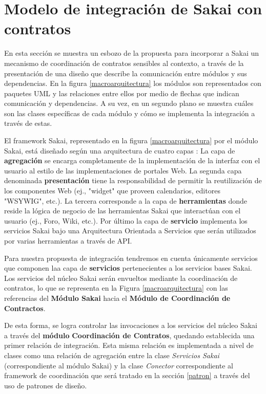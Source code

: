 \section {Modelo de integración de Sakai con contratos} \label{sec:integracion} \label{macro} 

En esta sección se muestra un esbozo de la propuesta para incorporar a Sakai un mecanismo de coordinación de contratos sensibles al contexto, a través de la presentación de una diseño que describe la comunicación entre módulos \cite{arqModulos} y sus dependencias. En la figura \ref{macroarquitectura} los módulos son representados con paquetes UML y las relaciones  entre ellos por medio de flechas que indican comunicación y  dependencias. A su vez, en un segundo plano se muestra cuáles son las clases específicas de cada módulo y cómo se implementa la integración a través de estas.


El framework Sakai, representado en la figura \ref{macroarquitectura} por el módulo Sakai, está diseñado según una arquitectura de cuatro capas \cite{arquitectura}: La capa de \textbf{agregación} se encarga completamente de la  implementación de la interfaz con el usuario al estilo de las implementaciones de portales Web. La segunda capa denominada \textbf{presentación} tiene la responsabilidad de permitir la reutilización de los componentes Web (ej., "widget" que proveen calendarios, editores "WSYWIG", etc.). La tercera corresponde a la capa de \textbf{herramientas} donde reside la lógica de negocio de las herramientas Sakai que interactúan con el usuario (ej., Foro, Wiki, etc.). Por último la capa de \textbf{servicio} implementa los servicios Sakai bajo una Arquitectura Orientada a Servicios que serán utilizados por varias herramientas a través de API. 

Para nuestra propuesta de integración tendremos en cuenta únicamente servicios que componen laa capa de \textbf{servicios} pertenecientes a los servicios bases Sakai. Los servicios del núcleo Sakai serán envueltos mediante la coordinación de contratos, lo que se representa en la Figura \ref{macroarquitectura} con las referencias del \textbf{Módulo Sakai} hacia el \textbf{Módulo de Coordinación de Contractos}.


De esta forma, se logra controlar las invocaciones a los servicios del núcleo Sakai a través del \textbf{módulo} \textbf{Coordinación de Contratos}, quedando establecida una primer relación de integración. Esta misma relación es implementada a nivel de clases como una relación de agregación entre la clase \textit{Servicios Sakai} (correspondiente al módulo Sakai) y la clase \textit{Conector} correspondiente al framework de coordinación que será tratado en la sección \ref{patron} a través del uso de patrones de diseño.

